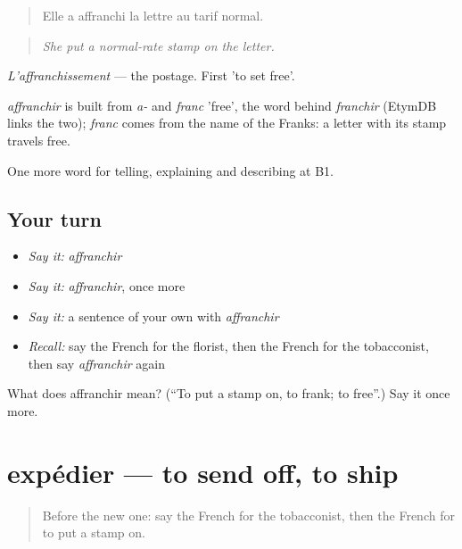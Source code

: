 \begin{quote}
Elle a affranchi la lettre au tarif normal.
\end{quote}

\begin{quote}
\emph{She put a normal-rate stamp on the letter.}
\end{quote}

\emph{L'affranchissement} — the postage. First 'to set free'.

\begin{cousinweb}
\emph{affranchir} is built from \emph{a-} and \emph{franc} 'free', the word behind \emph{franchir} (EtymDB links the two); \emph{franc} comes from the name of the Franks: a letter with its stamp travels free.
\end{cousinweb}

\begin{grammarlens}[title={What you've built}]
One more word for telling, explaining and describing at B1.
\end{grammarlens}

\subsection*{Your turn}
\begin{itemize}
\raggedright
  \item \emph{Say it:} \emph{affranchir}
  \item \emph{Say it:} \emph{affranchir}, once more
  \item \emph{Say it:} a sentence of your own with \emph{affranchir}
  \item \emph{Recall:} say the French for the florist, then the French for the tobacconist, then say \emph{affranchir} again
\end{itemize}

\begin{tcolorbox}[breakable,colback=teal!4,colframe=teal!35!black,title={Before you move on}]
What does affranchir mean? (\textquotedblleft{}To put a stamp on, to frank; to free\textquotedblright{}.) Say it once more.
\end{tcolorbox}
\section[expédier]{expédier — to send off, to ship}

\label{lesson:FR-C449-expedier}



\begin{quote}
Before the new one: say the French for the tobacconist, then the French for to put a stamp on.
\end{quote}


